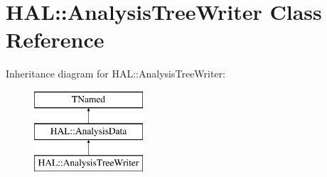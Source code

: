 \hypertarget{class_h_a_l_1_1_analysis_tree_writer}{\section{H\+A\+L\+:\+:Analysis\+Tree\+Writer Class Reference}
\label{class_h_a_l_1_1_analysis_tree_writer}
}
Inheritance diagram for H\+A\+L\+:\+:Analysis\+Tree\+Writer\+:\begin{figure}[H]
\begin{center}
\leavevmode
\includegraphics[height=3.000000cm]{class_h_a_l_1_1_analysis_tree_writer}
\end{center}
\end{figure}
